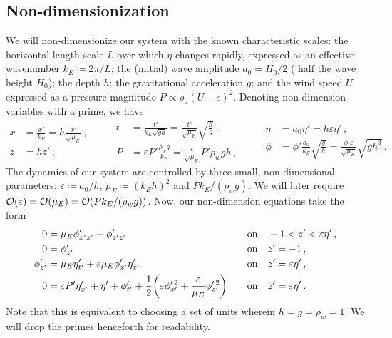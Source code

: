 \documentclass{jfm}
\renewcommand*{\epsilon}{\varepsilon}
\begin{document}
\subsection{\label{sec:nondim} Non-dimensionization}
We will non-dimensionize our system with the known characteristic
scales: the horizontal length scale $L$ over which $\eta$ changes
rapidly, expressed as an effective wavenumber $k_E \coloneqq 2 \pi/L$;
the (initial) wave amplitude $a_0 = H_0/2$ (\ie{} half the wave height
$H_0$); the depth $h$; the gravitational acceleration $g$; and the wind
speed $U$ expressed as a pressure magnitude $P \propto \rho_a (U-c)^2$.
Denoting non-dimension variables with a prime, we have
\begin{equation*}
  \begin{aligned}
  x &= \frac{x'}{k_E} = h \frac{x'}{\sqrt{\mu_E}}\,, \\
  z &= h z' \,,
  \end{aligned}
  \qquad
  \begin{aligned}
  t &= \frac{t'}{k_E\sqrt{g h}}
    = \frac{t'}{\sqrt{\mu_E}} \sqrt{\frac{h}{g}} \,, \\
  P &= \epsilon P' \frac{\rho_w g}{k_E}
    = \frac{\epsilon}{\sqrt{\mu_E}} P' \rho_w g h \,,
  \end{aligned}
  \qquad
  \begin{aligned}
  \eta &= a_0 \eta' = h \epsilon \eta' \,, \\
  \phi &= \phi'\frac{a_0}{k_E}\sqrt{\frac{g}{h}}
    = \frac{\phi'\epsilon}{\sqrt{\mu_E}}\sqrt{g h^3} \,.
  \end{aligned}
\end{equation*}
The dynamics of our system are controlled by three small,
non-dimensional parameters: $\epsilon \coloneqq a_0/h$, $\mu_E \coloneqq
(k_E h)^2$ and $P k_E/(\rho_w g)$.
We will later require $\order{\epsilon} = \order{\mu_E} =
\order{Pk_E/(\rho_w g)}$.
Now, our non-dimension equations take the form
\begin{alignat}{2}
  0 &= \mu_E \phi'_{x'x'} + \phi'_{z'z'} &&\qq{on}
    -1 < z' < \epsilon \eta' \,, \label{eq:laplace_nondim} \\
  0 &= \phi'_{z'} &&\qq{on} z'=-1 \,, \label{eq:bottom_bc_nondim} \\
  \phi'_{z'} &= \mu_E \eta'_{t'} +
    \epsilon \mu_E \phi'_{x'} \eta'_{x'} &&\qq{on} z' = \epsilon \eta' \,,
    \label{eq:kinematic_bc_nondim} \\
  0 &= \epsilon P' \eta'_{x'} +  \eta' + \phi'_{t'} + \frac{1}{2}
    \pqty{\epsilon \phi_{x'}^{\prime \, 2} + \frac{\epsilon}{\mu_E}
    \phi_{z'}^{\prime \, 2}} &&\qq{on} z'= \epsilon \eta' \,.
    \label{eq:dynamic_bc_nondim}
\end{alignat}
Note that this is equivalent to choosing a set of units wherein $h = g =
\rho_w = 1$.
We will drop the primes henceforth for readability.
\end{document}
